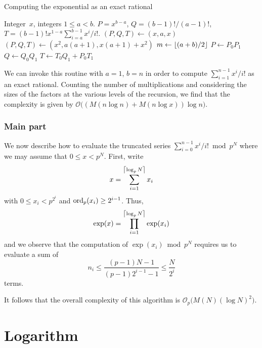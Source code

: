 \begin{algorithm}
\caption{Computing the exponential as an exact rational}
\label{alg:exp-bsplit}
\begin{algorithmic}
\vspace{1mm}
\Require Integer~$x$, integers $1 \leq a < b$.
\Ensure  $P = x^{b-a}$, $Q = (b-1)! / (a-1)!$, $T = (b-1)! x^{1-a} \sum_{i=a}^{b-1} x^i / i!$.
\State $(P, Q, T) \gets (x, a, x)$
\State $(P, Q, T) \gets (x^2, a (a + 1), x (a + 1) + x^2)$
\Else
\State $m \gets \left\lfloor(a + b) / 2\right\rfloor$
\State {}
\State {}
\State $P \gets P_0 P_1$
\State $Q \gets Q_0 Q_1$
\State $T \gets T_0 Q_1 + P_0 T_1$
\EndIf
\EndProcedure
\end{algorithmic}
\end{algorithm}

We can invoke this routine with $a = 1$, $b = n$ in order to compute 
$\sum_{i=1}^{n-1} x^i / i!$ as an exact rational.  Counting the 
number of multiplications and considering the sizes of the factors 
at the various levels of the recursion, we find that the complexity 
is given by $\mathcal{O}\bigl((M(n \log n) + M(n \log x) )\log n\bigr)$.

\subsubsection{Main part}

We now describe how to evaluate the truncated series 
$\sum_{i=0}^{n-1} x^i / i! \bmod{p^N}$ where we may assume 
that $0 \leq x < p^N$.  First, write 
\begin{equation}
x = \sum_{i=1}^{\left\lceil\log_p N\right\rceil} x_i
\end{equation}
with $0 \leq x_i < p^{2^i}$ and $\operatorname{ord}_p(x_i) \geq 2^{i-1}$.  Thus, 
\begin{equation}
\exp (x) = \prod_{i=1}^{\left\lceil\log_p N\right\rceil} \exp(x_i)
\end{equation}
and we observe that the computation of $\exp(x_i) \bmod p^N$ requires 
us to evaluate a sum of 
\begin{equation}
n_i \leq \frac{(p-1) N - 1}{(p-1) 2^{i-1} - 1} \leq \frac{N}{2^i}
\end{equation}
terms.

It follows that the overall complexity of this algorithm is 
$\mathcal{O}_p\bigl(M(N) (\log N)^2\bigr)$.

\section{Logarithm}

